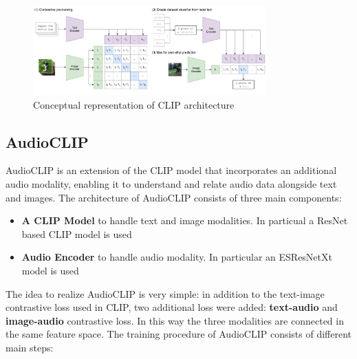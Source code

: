 \begin{figure}[H]
    \centering
    \includegraphics[width=0.8\textwidth, height=0.25\textheight]{img/CLIP.png}
    \caption{Conceptual representation of CLIP architecture}
\end{figure}

\subsection{AudioCLIP}
\label{sec:AudioClip}
AudioCLIP \cite{AudioCLIP} is an extension of the CLIP model that incorporates an additional audio modality, enabling it to understand and relate audio data alongside text and images. The architecture of AudioCLIP consists of three main components:
\begin{itemize}
    \item \textbf{A CLIP Model} to handle text and image modalities. In particual a ResNet based CLIP model is used
    \item \textbf{Audio Encoder} to handle audio modality. In particular an ESResNetXt model is used
\end{itemize}
The idea to realize AudioCLIP is very simple: in addition to the text-image contrastive loss used in CLIP, two additional loss were added: \textbf{text-audio} and \textbf{image-audio} contrastive loss. In this way the three modalities are connected in the same feature space. The training procedure of AudioCLIP consists of different main steps:
